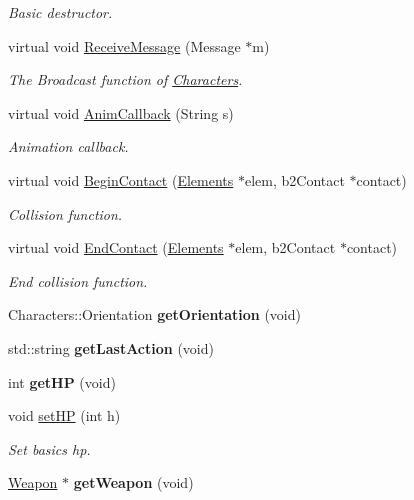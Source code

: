 \begin{DoxyCompactItemize}
\begin{DoxyCompactList}\small\item\em Basic destructor. \end{DoxyCompactList}\item 
virtual void \hyperlink{class_characters_ae6b55c4269efc485d7926f62544eef4e}{Receive\-Message} (Message $\ast$m)
\begin{DoxyCompactList}\small\item\em The Broadcast function of \hyperlink{class_characters}{Characters}. \end{DoxyCompactList}\item 
virtual void \hyperlink{class_characters_a6354b7fd409cde57312c5eca1cf43275}{Anim\-Callback} (String s)
\begin{DoxyCompactList}\small\item\em Animation callback. \end{DoxyCompactList}\item 
virtual void \hyperlink{class_characters_ae1b52f35e60cd23ec118595a9a8e8760}{Begin\-Contact} (\hyperlink{class_elements}{Elements} $\ast$elem, b2\-Contact $\ast$contact)
\begin{DoxyCompactList}\small\item\em Collision function. \end{DoxyCompactList}\item 
virtual void \hyperlink{class_characters_a87c76bb34f5c11e2da4537be07d2f846}{End\-Contact} (\hyperlink{class_elements}{Elements} $\ast$elem, b2\-Contact $\ast$contact)
\begin{DoxyCompactList}\small\item\em End collision function. \end{DoxyCompactList}\item 
\hypertarget{class_characters_a9be6daa0dc468da9c4c0ffa0d0d36ae1}{Characters\-::\-Orientation {\bfseries get\-Orientation} (void)}\label{class_characters_a9be6daa0dc468da9c4c0ffa0d0d36ae1}

\item 
\hypertarget{class_characters_a0df57bdee9ddc5e4e18954b8b30b1331}{std\-::string {\bfseries get\-Last\-Action} (void)}\label{class_characters_a0df57bdee9ddc5e4e18954b8b30b1331}

\item 
\hypertarget{class_characters_a136d6ba8b4bd401fda19b14b089a107f}{int {\bfseries get\-H\-P} (void)}\label{class_characters_a136d6ba8b4bd401fda19b14b089a107f}

\item 
void \hyperlink{class_characters_a63874c1b86156aa6c4c6a7c26afef6e7}{set\-H\-P} (int h)
\begin{DoxyCompactList}\small\item\em Set basics hp. \end{DoxyCompactList}\item 
\hypertarget{class_characters_aae885a7d773657cdf18f8dfced51d1a8}{\hyperlink{class_weapon}{Weapon} $\ast$ {\bfseries get\-Weapon} (void)}\label{class_characters_aae885a7d773657cdf18f8dfced51d1a8}


\end{DoxyCompactItemize}
